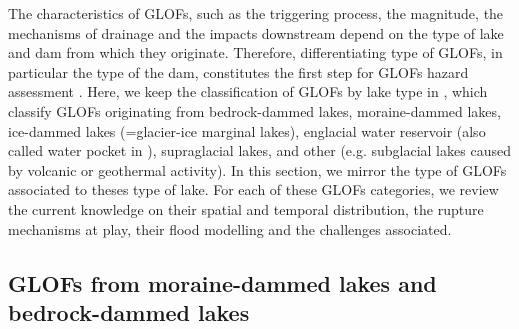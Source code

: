 The characteristics of GLOFs, such as the triggering process, the magnitude, the mechanisms of drainage and the impacts downstream depend on the type of lake and dam from which they originate. Therefore, differentiating type of GLOFs, in particular the type of the dam, constitutes the first step for GLOFs hazard assessment \citep{Allen&al2022}. Here, we keep the classification of GLOFs by lake type in \cite{Zhang&al2024}, which classify GLOFs originating from bedrock-dammed lakes, moraine-dammed lakes, ice-dammed lakes (=glacier-ice marginal lakes), englacial water reservoir (also called water pocket in \cite{Lutzow&al2023}), supraglacial lakes, and other (e.g. subglacial lakes caused by volcanic or geothermal activity). In this section, we mirror the type of GLOFs associated to theses type of lake. For each of these GLOFs categories, we review the current knowledge on their spatial and temporal distribution, the rupture mechanisms at play, their flood modelling and the challenges associated. 


\subsection{GLOFs from moraine-dammed lakes and bedrock-dammed lakes}


